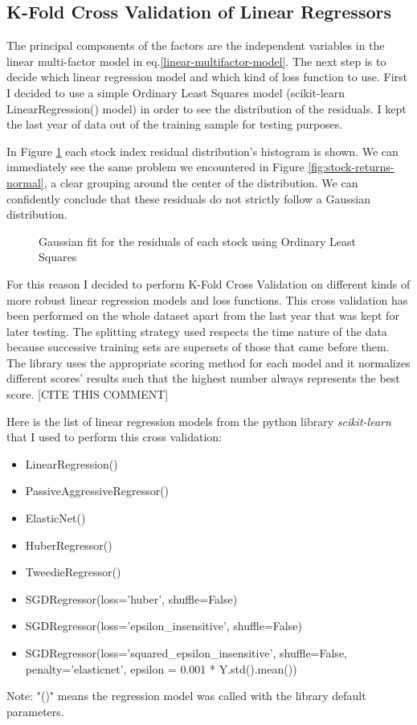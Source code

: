 \subsection{K-Fold Cross Validation of Linear Regressors}
The principal components of the factors are the independent variables in the linear multi-factor model in eq.\eqref{linear-multifactor-model}. The next step is to decide which linear regression model and which kind of loss function to use.
First I decided to use a simple Ordinary Least Squares model (scikit-learn LinearRegression() model) in order to see the distribution of the residuals. I kept the last year of data out of the training sample for testing purposes.

In Figure \ref{fig:linreg-residuals} each stock index residual distribution's histogram is shown. We can immediately see the same problem we encountered in Figure \ref{fig:stock-returns-normal}, a clear grouping around the center of the distribution. We can confidently conclude that these residuals do not strictly follow a Gaussian distribution.

\begin{figure}[htb]
	\centering
	
	\caption{Gaussian fit for the residuals of each stock using Ordinary Least Squares}
	\label{fig:linreg-residuals}
\end{figure}

For this reason I decided to perform K-Fold Cross Validation on different kinds of more robust linear regression models and loss functions. This cross validation has been performed on the whole dataset apart from the last year that was kept for later testing. The splitting strategy used respects the time nature of the data because successive training sets are supersets of those that came before them.
The library uses the appropriate scoring method for each model and it normalizes different scores' results such that the highest number always represents the best score. [CITE THIS COMMENT]

Here is the list of linear regression models from the python library \textit{scikit-learn} that I used to perform this cross validation:
\begin{itemize}
	\item LinearRegression()
	\item PassiveAggressiveRegressor()
	\item ElasticNet()
	\item HuberRegressor()
	\item TweedieRegressor()
	\item SGDRegressor(loss='huber', shuffle=False)
	\item SGDRegressor(loss='epsilon\_insensitive', shuffle=False)
	\item SGDRegressor(loss='squared\_epsilon\_insensitive', shuffle=False, penalty='elasticnet', epsilon = 0.001 * Y.std().mean())
\end{itemize}
Note: "()" means the regression model was called with the library default parameters.


